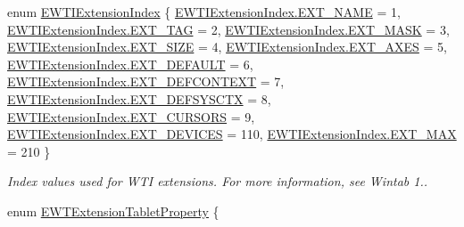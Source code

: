 \begin{DoxyCompactItemize}
enum \mbox{\hyperlink{namespace_wintab_d_n_a52875c234488913934e0d49ac13c438d}{E\+W\+T\+I\+Extension\+Index}} \{ \newline
\mbox{\hyperlink{namespace_wintab_d_n_a52875c234488913934e0d49ac13c438da1ec0e4f68094eb2e5859e96251b4a0ec}{E\+W\+T\+I\+Extension\+Index.\+E\+X\+T\+\_\+\+N\+A\+ME}} = 1, 
\mbox{\hyperlink{namespace_wintab_d_n_a52875c234488913934e0d49ac13c438da1cc6a78e746837d3411ac9f4a2e6c7d1}{E\+W\+T\+I\+Extension\+Index.\+E\+X\+T\+\_\+\+T\+AG}} = 2, 
\mbox{\hyperlink{namespace_wintab_d_n_a52875c234488913934e0d49ac13c438daaac931541c2f53185b193d3d1a49ff6b}{E\+W\+T\+I\+Extension\+Index.\+E\+X\+T\+\_\+\+M\+A\+SK}} = 3, 
\mbox{\hyperlink{namespace_wintab_d_n_a52875c234488913934e0d49ac13c438da6d1cd8a011d4a738d2dca76d2cf33135}{E\+W\+T\+I\+Extension\+Index.\+E\+X\+T\+\_\+\+S\+I\+ZE}} = 4, 
\newline
\mbox{\hyperlink{namespace_wintab_d_n_a52875c234488913934e0d49ac13c438da381f486f06a6e75d307ac22bbe713769}{E\+W\+T\+I\+Extension\+Index.\+E\+X\+T\+\_\+\+A\+X\+ES}} = 5, 
\mbox{\hyperlink{namespace_wintab_d_n_a52875c234488913934e0d49ac13c438da9071a43376322d78e7d7f130518c7b0b}{E\+W\+T\+I\+Extension\+Index.\+E\+X\+T\+\_\+\+D\+E\+F\+A\+U\+LT}} = 6, 
\mbox{\hyperlink{namespace_wintab_d_n_a52875c234488913934e0d49ac13c438dabf003112a9bc3a0e98c7e66980db14a5}{E\+W\+T\+I\+Extension\+Index.\+E\+X\+T\+\_\+\+D\+E\+F\+C\+O\+N\+T\+E\+XT}} = 7, 
\mbox{\hyperlink{namespace_wintab_d_n_a52875c234488913934e0d49ac13c438da1ae7e21f7b68ac6f8f9ef7955350268e}{E\+W\+T\+I\+Extension\+Index.\+E\+X\+T\+\_\+\+D\+E\+F\+S\+Y\+S\+C\+TX}} = 8, 
\newline
\mbox{\hyperlink{namespace_wintab_d_n_a52875c234488913934e0d49ac13c438da0b3aaf32240828ddea4bb17e181e7e72}{E\+W\+T\+I\+Extension\+Index.\+E\+X\+T\+\_\+\+C\+U\+R\+S\+O\+RS}} = 9, 
\mbox{\hyperlink{namespace_wintab_d_n_a52875c234488913934e0d49ac13c438dacadc6afca8e1cb7eda7a02e8290cb20e}{E\+W\+T\+I\+Extension\+Index.\+E\+X\+T\+\_\+\+D\+E\+V\+I\+C\+ES}} = 110, 
\mbox{\hyperlink{namespace_wintab_d_n_a52875c234488913934e0d49ac13c438daf0e151047e92ec2a7458b4b99858f4d8}{E\+W\+T\+I\+Extension\+Index.\+E\+X\+T\+\_\+\+M\+AX}} = 210
 \}
\begin{DoxyCompactList}\small\item\em Index values used for W\+TI extensions. For more information, see Wintab 1.. \end{DoxyCompactList}\item 
enum \mbox{\hyperlink{namespace_wintab_d_n_a21cb408997e6cbe0866e75b0fe0a743f}{E\+W\+T\+Extension\+Tablet\+Property}} \{ \newline

\end{DoxyCompactItemize}
